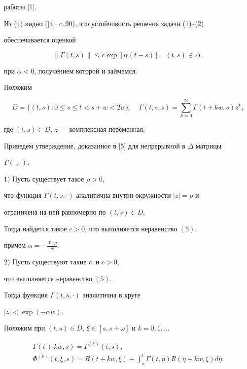 работы [1].





Из (4) видно ([4], c.\,90), что устойчивость решения задачи (1)--(2)


обеспечивается оценкой


\begin{equation}


\|\Gamma(t,s)\|\le c\exp[\alpha(t-s)],\ \;(t,s)\in\Delta,


\end{equation}


при $\alpha<0$, получением которой и займемся.


Положим


$$


D=\{(t,s):0\le s\le t<s+w<2w\},\quad


\Gamma(t,s,z)=\sum_{k=0}^\infty\Gamma(t+kw,s)z^k,


$$


где $(t,s)\in D$, $z$ --- комплексная переменная.


Приведем утверждение, доказанное в [5] для непрерывной в $\Delta$ матрицы


$\Gamma(\cdot,\cdot)$.





\begin{thm} $1)$ Пусть существует такое $\rho>0$,


что функция $\Gamma(t,s,\cdot)$ аналитична внутри окружности $|z|=\rho$ и


ограничена на ней равномерно по $(t,s)\in D$. 


Тогда найдется такое $c>0$, что выполняется неравенство $(5)$,


причем $\alpha=-\frac{\ln\rho}{w}$.





$2)$ Пусть существуют такие $\alpha$ и $c>0$,


что выполняется неравенство $(5)$.


Тогда функция $\Gamma(t,s,\cdot)$ аналитична в круге


$|z|<\exp(-\alpha w)$.


\end{thm}





Положим при $(t,s)\in D$, $\xi\in[s,s+\omega]$ и $k=0,1,\dotsc$


\begin{gather*}


\Gamma(t+kw,s)=\Gamma^{(k)}(t,s), \\


%


\Phi^{(k)}(t,\xi,s)=R(t+kw,\xi)+\int_s^t\Gamma(t,\eta)R(\eta+kw,\xi)d\eta.


\end{gather*}


